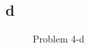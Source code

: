 \documentclass[a4paper,11pt]{article}
\theoremstyle{mytheor}
\begin{document}
\subsection*{d}
\begin{figure}[h]
	\caption{Problem 4-d}
\end{figure}
\end{document}
